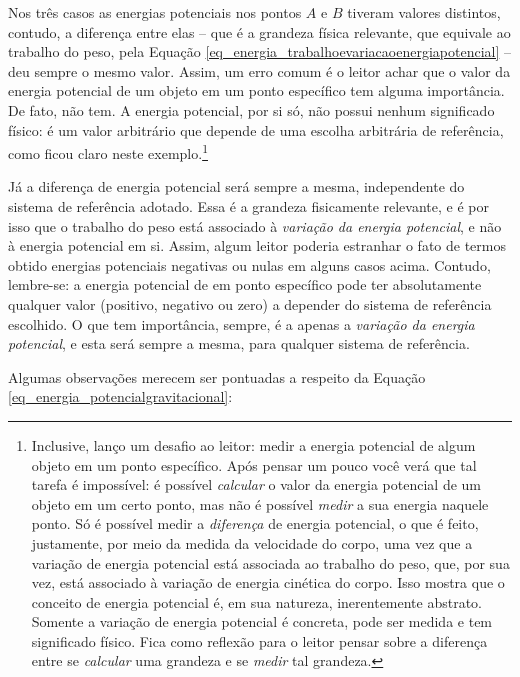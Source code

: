 Nos três casos as energias potenciais nos pontos $A$ e $B$ tiveram valores distintos, contudo, a diferença entre elas -- que é a grandeza física relevante, que equivale ao trabalho do peso, pela Equação \eqref{eq_energia_trabalhoevariacaoenergiapotencial} -- deu sempre o mesmo valor. Assim, um erro comum é o leitor achar que o valor da energia potencial de um objeto em um ponto específico tem alguma importância. De fato, não tem. A energia potencial, por si só, não possui nenhum significado físico: é um valor arbitrário que depende de uma escolha arbitrária de referência, como ficou claro neste exemplo.\footnote{Inclusive, lanço um desafio ao leitor: medir a energia potencial de algum objeto em um ponto específico. Após pensar um pouco você verá que tal tarefa é impossível: é possível \emph{calcular} o valor da energia potencial de um objeto em um certo ponto, mas não é possível \emph{medir} a sua energia naquele ponto. Só é possível medir a \emph{diferença} de energia potencial, o que é feito, justamente, por meio da medida da velocidade do corpo, uma vez que a variação de energia potencial está associada ao trabalho do peso, que, por sua vez, está associado à variação de energia cinética do corpo. Isso mostra que o conceito de energia potencial é, em sua natureza, inerentemente abstrato. Somente a variação de energia potencial é concreta, pode ser medida e tem significado físico. Fica como reflexão para o leitor pensar sobre a diferença entre se \emph{calcular} uma grandeza e se \emph{medir} tal grandeza.}

Já a diferença de energia potencial será sempre a mesma, independente do sistema de referência adotado. Essa é a grandeza fisicamente relevante, e é por isso que o trabalho do peso está associado à \emph{variação da energia potencial}, e não à energia potencial em si. Assim, algum leitor poderia estranhar o fato de termos obtido energias potenciais negativas ou nulas em alguns casos acima. Contudo, lembre-se: a energia potencial de em ponto específico pode ter absolutamente qualquer valor (positivo, negativo ou zero) a depender do sistema de referência escolhido. O que tem importância, sempre, é a apenas a  \emph{variação da energia potencial}, e esta será sempre a mesma, para qualquer sistema de referência.




Algumas observações merecem ser pontuadas a respeito da Equação \eqref{eq_energia_potencialgravitacional}:

